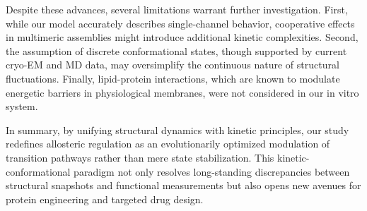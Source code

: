\documentclass[pdflatex,sn-nature]{sn-jnl}%
\theoremstyle{thmstyleone}%
\theoremstyle{thmstyletwo}%
\theoremstyle{thmstylethree}%
\begin{document}
Despite these advances, several limitations warrant further investigation. First, while our model accurately describes single-channel behavior, cooperative effects in multimeric assemblies might introduce additional kinetic complexities. Second, the assumption of discrete conformational states, though supported by current cryo-EM and MD data, may oversimplify the continuous nature of structural fluctuations. Finally, lipid-protein interactions, which are known to modulate energetic barriers in physiological membranes, were not considered in our in vitro system.

In summary, by unifying structural dynamics with kinetic principles, our study redefines allosteric regulation as an evolutionarily optimized modulation of transition pathways rather than mere state stabilization. This kinetic-conformational paradigm not only resolves long-standing discrepancies between structural snapshots and functional measurements but also opens new avenues for protein engineering and targeted drug design.


\end{document}
